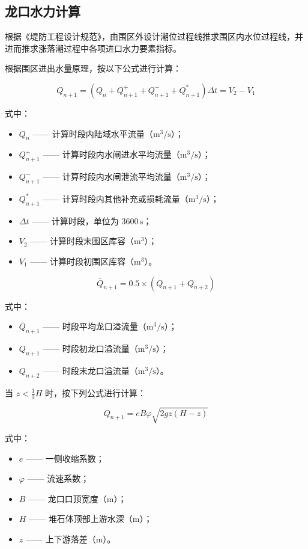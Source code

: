\documentclass[UTF8, a4paper, 12pt]{ctexart} %
\begin{document}
\subsection{龙口水力计算}
根据《堤防工程设计规范》，由围区外设计潮位过程线推求围区内水位过程线，并进而推求涨落潮过程中各项进口水力要素指标。

根据围区进出水量原理，按以下公式进行计算：

\[
Q_{n+1} = (Q_n + Q_{n+1}^+ + Q_{n+1}^- + Q_{n+1}^*) \Delta t = V_2 - V_1
\]

式中：
\begin{itemize}
    \item $Q_n$ —— 计算时段内陆域水平流量（$\text{m}^3/\text{s}$）；
    \item $Q_{n+1}^+$ —— 计算时段内水闸进水平均流量（$\text{m}^3/\text{s}$）；
    \item $Q_{n+1}^-$ —— 计算时段内水闸泄流平均流量（$\text{m}^3/\text{s}$）；
    \item $Q_{n+1}^*$ —— 计算时段内其他补充或损耗流量（$\text{m}^3/\text{s}$）；
    \item $\Delta t$ —— 计算时段，单位为 $3600\,\text{s}$；
    \item $V_2$ —— 计算时段末围区库容（$\text{m}^3$）；
    \item $V_1$ —— 计算时段初围区库容（$\text{m}^3$）。
\end{itemize}

\[
\bar{Q}_{n+1} = 0.5 \times (Q_{n+1} + Q_{n+2}) \tag{9-3}
\]

式中：
\begin{itemize}
    \item $\bar{Q}_{n+1}$ —— 时段平均龙口溢流量（$\text{m}^3/\text{s}$）；
    \item $Q_{n+1}$ —— 时段初龙口溢流量（$\text{m}^3/\text{s}$）；
    \item $Q_{n+2}$ —— 时段末龙口溢流量（$\text{m}^3/\text{s}$）。
\end{itemize}

当 $z < \frac{1}{3}H$ 时，按下列公式进行计算：

\[
Q_{n+1} = e B \varphi \sqrt{2g z (H - z)} \tag{9-4}
\]

式中：
\begin{itemize}
    \item $e$ —— 一侧收缩系数；
    \item $\varphi$ —— 流速系数；
    \item $B$ —— 龙口口顶宽度（$\text{m}$）；
    \item $H$ —— 堆石体顶部上游水深（$\text{m}$）；
    \item $z$ —— 上下游落差（$\text{m}$）。
\end{itemize}
\end{document}
